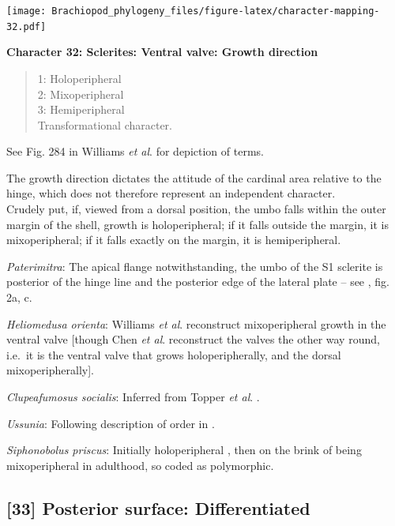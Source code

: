 \documentclass[]{book}
\theoremstyle{definition}
\theoremstyle{definition}
\theoremstyle{definition}
\theoremstyle{remark}
\begin{document}
\texttt{[image: Brachiopod\_phylogeny\_files/figure-latex/character-mapping-32.pdf]}

\textbf{Character 32: Sclerites: Ventral valve: Growth direction}

\begin{quote}
1: Holoperipheral\\
2: Mixoperipheral\\
3: Hemiperipheral\\
Transformational character.
\end{quote}

See Fig. 284 in Williams \emph{et al}.
\citeyearpar{Williams1997BrachiopodaRevised} for depiction of terms.

The growth direction dictates the attitude of the cardinal area relative
to the hinge, which does not therefore represent an independent
character.\\
Crudely put, if, viewed from a dorsal position, the umbo falls within
the outer margin of the shell, growth is holoperipheral; if it falls
outside the margin, it is mixoperipheral; if it falls exactly on the
margin, it is hemiperipheral.

\emph{Paterimitra}: The apical flange notwithstanding, the umbo of the
S1 sclerite is posterior of the hinge line and the posterior edge of the
lateral plate -- see \citet{Larsson2014iPaterimitra}, fig. 2a, c.

\emph{Heliomedusa orienta}: Williams \emph{et al}.
\citeyearpar[2007]{Williams2000BrachiopodaLinguliformea} reconstruct
mixoperipheral growth in the ventral valve {[}though Chen \emph{et al}.
\citeyearpar{Chen2007Reinterpretationof} reconstruct the valves the
other way round, i.e.~it is the ventral valve that grows
holoperipherally, and the dorsal mixoperipherally{]}.

\emph{Clupeafumosus socialis}: Inferred from Topper \emph{et al}.
\citeyearpar{Topper2013Reappraisalof}.

\emph{Ussunia}: Following description of order in
\citet{Williams2000BrachiopodaLinguliformea}.

\emph{Siphonobolus priscus}: Initially holoperipheral
\citep[p.~159]{Popov2009Earlyontogeny}, then on the brink of being
mixoperipheral in adulthood, so coded as polymorphic.

\hypertarget{posterior-surface-differentiated-1}{%
\subsection*{{[}33{]} Posterior surface:
Differentiated}\label{posterior-surface-differentiated-1}}
\end{document}
